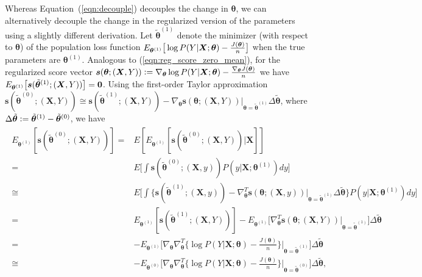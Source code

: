 \documentclass[twoside,11pt]{article}
\begin{document}
Whereas Equation~(\ref{eqn:decouple}) decouples the change in $ \bm { \theta}$, we can alternatively decouple the change in the regularized version of the parameters using a slightly different derivation. Let $\tilde{ \bm { \theta}} ^{ (1)}$ denote the minimizer (with respect to $\bm{\theta}$) of the population loss function $\\E _{\bm { \theta}^{ (1)}} \big[ \log{ P(Y|\bm{X};\bm{\theta})} - \frac{J(\bm{\theta})}{n}\big]$ when the true parameters are $\bm { \theta} ^{ (1)}$. Analogous to (\ref{eqn:reg_score_zero_mean}), for the regularized score vector $\bm{s}(\bm{\theta};(\bm{X},Y)) \vcentcolon= \nabla_{\bm{\theta}} \log{P(Y|\bm{X};\bm{\theta})} -\frac{\nabla_{\bm{\theta}}J(\bm{\theta})}{n}$ we have $\\E _{\bm { \theta}^{ (1)}} \big[ \bm{s} (\tilde{ \bm { \theta}} ^{ (1)}; (\bm{X},Y) ) \big] = \bm{0}$. Using the first-order Taylor approximation $ \bm{s} (\tilde{ \bm { \theta}} ^{ (0)}; (\bm{X},Y) ) \cong \bm{s} (\tilde{ \bm { \theta}} ^{ (1)}; (\bm{X},Y) ) - \nabla_{\bm{\theta}} \bm{s} (\bm { \theta}; (\bm{X},Y) ) |_{\bm{\theta} = \tilde{\bm{\theta}}^{(1)}} \Delta \tilde{\bm{ \theta}}$, where $\Delta\tilde{\bm{ \theta}} \vcentcolon= \tilde{ \bm { \theta}} ^{ (1)} - \tilde{ \bm { \theta}} ^{ (0)}$, we have 
\begin{align}
\begin{aligned}
E _{\bm { \theta}^{ (1)}}[\bm{s} (\tilde{ \bm { \theta}} ^{ (0)}; (\bm{X},Y) )] 
= & E[E _{\bm { \theta}^{ (1)}}[\bm{s} (\tilde{ \bm { \theta}} ^{ (0)}; (\bm{X},Y) )| \bm {X}] ] \\
= & E\big[\int \bm{s} (\tilde{ \bm { \theta}} ^{ (0)}; (\bm{X},y)) P(y | \bm {X}; \bm{\theta} ^{ (1)}) dy \big] \\
\cong & E \big[\int \big\{ \bm{s} (\tilde{ \bm { \theta}} ^{ (1)}; (\bm{X},y)) - \nabla^T_{\bm{\theta}} \bm{s} (\bm { \theta}; (\bm{X},y) ) |_{\bm{\theta} = \tilde{\bm{\theta}}^{(1)}} \Delta \tilde{\bm{ \theta}} \big\} P(y | \bm {X}; \bm{\theta} ^{ (1)}) dy \big] \\
= & E_{\bm { \theta}^{ (1)}}[\bm{s} (\tilde{ \bm { \theta}} ^{ (1)}; (\bm{X},Y) )] - E_{\bm { \theta}^{ (1)}} \big[ \nabla^T_{\bm{\theta}} \bm{s} (\bm { \theta}; (\bm{X},Y) ) |_{\bm{\theta} = \tilde{\bm{\theta}}^{(1)}} \big] \Delta \tilde{\bm{ \theta}} \\ 
= &  - E_{\bm { \theta}^{ (1)}} \big[ \nabla_{\bm{\theta}} \nabla^T_{\bm{\theta}} \big\{ \log{P(Y | \bm{X}; \bm{\theta})} - \frac{J(\bm{\theta})}{n} \big\} |_{\bm{\theta} = \tilde{\bm{\theta}}^{(1)}} \big] \Delta \tilde{\bm{ \theta}} \\
\cong &  - E_{\bm { \theta}^{ (0)}} \big[ \nabla_{\bm{\theta}} \nabla^T_{\bm{\theta}} \big\{ \log{P(Y | \bm{X}; \bm{\theta})} - \frac{J(\bm{\theta})}{n} \big\} |_{\bm{\theta} = \tilde{\bm{\theta}}^{(0)}} \big] \Delta \tilde{\bm{ \theta}},
\end{aligned}
\label{eqn:cd_mean_shift}
\end{align}
\end{document}
